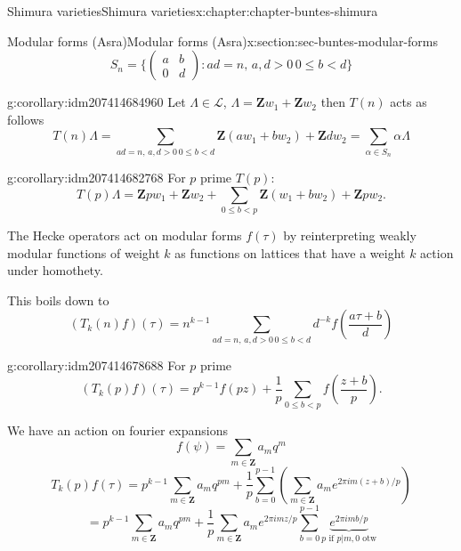 \documentclass[oneside,10pt,]{book}
\numberwithin{equation}{section}
\newcommand{\ZZ}{\mathbf{Z}}
\newcommand{\lt}{<}
\newcommand{\gt}{>}
\newcommand{\amp}{&}
\begin{document}
\begin{chapterptx}{Shimura varieties}{}{Shimura varieties}{}{}{x:chapter:chapter-buntes-shimura}
\begin{sectionptx}{Modular forms (Asra)}{}{Modular forms (Asra)}{}{}{x:section:sec-buntes-modular-forms}
\begin{equation*}
S_n = \{\begin{pmatrix} a\amp b \\ 0 \amp d\end{pmatrix} : ad= n,\, a,d\gt 0\, 0\le b \lt d\}
\end{equation*}
%
\begin{corollary}{}{}{g:corollary:idm207414684960}%
Let \(\Lambda \in \mathcal L\), \(\Lambda = \ZZ w_1 + \ZZ w_2\) then  \(T(n)\) acts as follows%
\begin{equation*}
T(n) \Lambda =  \sum_{ ad= n,\, a,d\gt 0\, 0\le b \lt d} \ZZ(aw_1 + bw_2) + \ZZ dw_2 = \sum_{\alpha \in S_n} \alpha \Lambda
\end{equation*}
%
\end{corollary}
\begin{corollary}{}{}{g:corollary:idm207414682768}%
For \(p \) prime \(T(p)\):%
\begin{equation*}
T(p) \Lambda = \ZZ pw_1 + \ZZ w_2 +\sum_{0 \le b \lt p} \ZZ(w_1 + bw_2) + \ZZ pw_2\text{.}
\end{equation*}
%
\end{corollary}
The Hecke operators act on modular forms \(f(\tau)\) by reinterpreting weakly modular functions of weight \(k\) as functions on lattices that have  a weight \(k\) action under homothety.%
\par
This boils down to%
\begin{equation*}
(T_k(n) f)(\tau) = n^{k-1}  \sum_{ ad= n,\, a,d\gt 0\, 0\le b \lt d} d^{-k} f\left( \frac{ a\tau +b}{d}\right)
\end{equation*}
%
\begin{corollary}{}{}{g:corollary:idm207414678688}%
For \(p \) prime%
\begin{equation*}
(T_k(p) f)(\tau) = p^{k-1}f(pz) +\frac 1p \sum_{0 \le b  \lt p} f\left( \frac {z + b}{p} \right)\text{.}
\end{equation*}
%
\end{corollary}
We have an action on fourier expansions%
\begin{equation*}
f(\psi) = \sum_{m\in \ZZ} a_m q^m
\end{equation*}
%
\begin{equation*}
T_k(p)f(\tau) = p^{k-1} \sum_{m\in \ZZ} a_m q^{pm} + \frac{1}{p} \sum_{b=0}^{p-1}  \left( \sum_{m\in \ZZ} a_m e^{2\pi i m (z+b)/p}\right)
\end{equation*}
%
\begin{equation*}
= p^{k-1} \sum_{m\in \ZZ} a_m q^{pm} + \frac{1}{p}  \sum_{m\in \ZZ} a_me^{2\pi i m z/p} \sum_{b=0}^{p-1} \underbrace{e^{2\pi i m b/p}}_{p\text{ if }p|m,0\text{ otw}}

\end{equation*}
\end{sectionptx}
\end{chapterptx}
\end{document}
